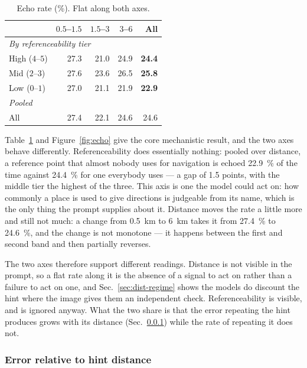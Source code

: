\documentclass[10pt,a4paper]{article}
\begin{document}
\begin{table}[!htbp]
\centering
\caption{Echo rate (\si{\percent}). Flat along both axes.}
\label{tab:echo}
\begin{tabular}{lrrrr}
\toprule
 & $0.5$--$1.5$ & $1.5$--$3$ & $3$--$6$ & All \\
\midrule
\multicolumn{5}{l}{\emph{By referenceability tier}}\\
High ($4$--$5$) & 27.3 & 21.0 & 24.9 & \textbf{24.4} \\
Mid  ($2$--$3$) & 27.6 & 23.6 & 26.5 & \textbf{25.8} \\
Low  ($0$--$1$) & 27.0 & 21.1 & 21.9 & \textbf{22.9} \\
\midrule
\multicolumn{5}{l}{\emph{Pooled}}\\
All & 27.4 & 22.1 & 24.6 & 24.6 \\
\bottomrule
\end{tabular}
\end{table}

Table~\ref{tab:echo} and Figure~\ref{fig:echo} give the core mechanistic
result, and the two axes behave differently. Referenceability does essentially
nothing: pooled over distance, a reference point that almost nobody uses for
navigation is echoed \SI{22.9}{\percent} of the time against
\SI{24.4}{\percent} for one everybody uses --- a gap of \num{1.5} points, with
the middle tier the highest of the three. This axis is one the model could act
on: how commonly a place is used to give directions is judgeable from its name,
which is the only thing the prompt supplies about it. Distance moves the rate a
little more and still not much: a change from \SI{0.5}{\kilo\metre} to
\SI{6}{\kilo\metre} takes it from \SI{27.4}{\percent} to \SI{24.6}{\percent},
and the change is not monotone --- it happens between the first and second band
and then partially reverses.

The two axes therefore support different readings. Distance is not visible in
the prompt, so a flat rate along it is the absence of a signal to act on rather
than a failure to act on one, and Sec.~\ref{sec:dist-regime} shows the models
do discount the hint where the image gives them an independent check.
Referenceability is visible, and is ignored anyway. What the two share is that
the error repeating the hint produces grows with its distance
(Sec.~\ref{sec:ratio}) while the rate of repeating it does not.

\subsubsection{Error relative to hint distance}
\label{sec:ratio}
\end{document}
